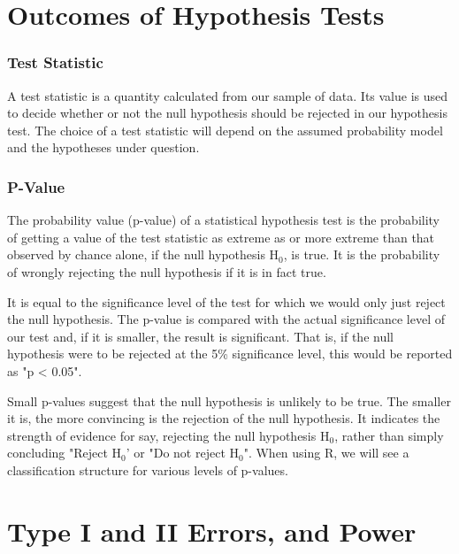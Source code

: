 \documentclass{beamer}
\begin{document}
\section{Outcomes of Hypothesis Tests}
\begin{frame}	
\frametitle{Test Statistic}
	A test statistic is a quantity calculated from our sample of data. Its
	value is used to decide whether or not the null hypothesis should be
	rejected in our hypothesis test.
	The choice of a test statistic will depend on the assumed probability
	model and the hypotheses under question.

\end{frame}
\begin{frame}
\frametitle{P-Value}
	The probability value (p-value) of a statistical hypothesis test is the
	probability of getting a value of the test statistic as extreme as or
	more extreme than that observed by chance alone, if the null
	hypothesis H$_0$, is true.
	It is the probability of wrongly rejecting the null hypothesis if it is in
	fact true.
\end{frame}
\begin{frame}
		It is equal to the significance level of the test for which we would
	only just reject the null hypothesis.
	The p-value is compared with the actual significance level of our
	test and, if it is smaller, the result is significant. That is, if the null
	hypothesis were to be rejected at the 5\% significance level, this
	would be reported as "p < 0.05".
\end{frame}
\begin{frame}	Small p-values suggest that the null hypothesis is unlikely to be
	true. The smaller it is, the more convincing is the rejection of the
	null hypothesis.
	It indicates the strength of evidence for say, rejecting the null
	hypothesis H$_0$, rather than simply concluding "Reject H$_0$' or "Do not
	reject H$_0$".
	When using R, we will see a classification structure for various
	levels of p-values.
\end{frame}

	\section{Type I and II Errors, and Power}
	
\end{document}

